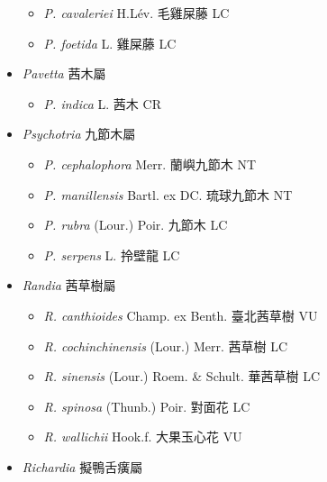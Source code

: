 \begin{itemize}
  \begin{itemize}
        \item[] \textit{P. cavaleriei} H.Lév.  毛雞屎藤   LC
        \item[] \textit{P. foetida} L.  雞屎藤   LC
  \end{itemize}
 \item[] \textit{Pavetta} 茜木屬
                                
  \begin{itemize}
        \item[] \textit{P. indica} L.  茜木   CR
  \end{itemize}
 \item[] \textit{Psychotria} 九節木屬
                                
  \begin{itemize}
        \item[] \textit{P. cephalophora} Merr.  蘭嶼九節木   NT
        \item[] \textit{P. manillensis} Bartl. ex DC.  琉球九節木   NT
        \item[] \textit{P. rubra} (Lour.) Poir.  九節木   LC
        \item[] \textit{P. serpens} L.  拎壁龍   LC
  \end{itemize}
 \item[] \textit{Randia} 茜草樹屬
                                
  \begin{itemize}
        \item[] \textit{R. canthioides} Champ. ex Benth.  臺北茜草樹   VU
        \item[] \textit{R. cochinchinensis} (Lour.) Merr.  茜草樹   LC
        \item[] \textit{R. sinensis} (Lour.) Roem. \& Schult.  華茜草樹   LC
        \item[] \textit{R. spinosa} (Thunb.) Poir.  對面花   LC
        \item[] \textit{R. wallichii} Hook.f.  大果玉心花   VU
  \end{itemize}
 \item[] \textit{Richardia} 擬鴨舌癀屬
                                

\end{itemize}
